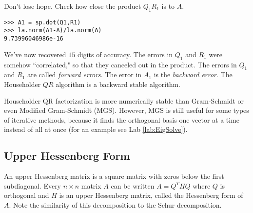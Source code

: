 Don't lose hope. Check how close the product $Q_1 R_1$ is to $A$.
\begin{lstlisting}
>>> A1 = sp.dot(Q1,R1)
>>> la.norm(A1-A)/la.norm(A)
9.73996046986e-16
\end{lstlisting}
We've now recovered $15$ digits of accuracy.
The errors in $Q_1$ and $R_1$ were somehow ``correlated," so that they canceled out in the product.
The errors in $Q_1$ and $R_1$ are called \emph{forward errors}.
The error in $A_1$ is the \emph{backward error}.
The Householder $QR$ algorithm is a backward stable algorithm.

Householder QR factorization is more numerically stable than Gram-Schmidt or even Modified Gram-Schmidt (MGS).
However, MGS is still useful for some types of iterative methods, because it finds the orthogonal basis one vector at a time instead of all at once (for an example see Lab \ref{lab:EigSolve}).

\subsection*{Upper Hessenberg Form}
An upper Hessenberg matrix is a square matrix with zeros below the first subdiagonal.
Every  $n \times n$ matrix $A$ can be written $A = Q^THQ$ where $Q$ is orthogonal and $H$ is an upper Hessenberg matrix, called the Hessenberg form of $A$.
Note the similarity of this decomposition to the Schur decomposition.

